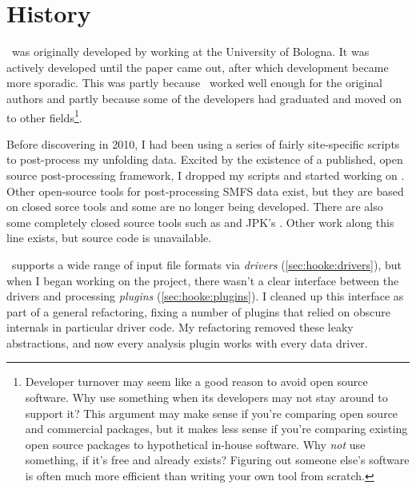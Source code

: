 \section{History}
\label{sec:hooke:history}

\Hooke\ was originally developed by \citet{sandal09} working at the
University of Bologna.  It was actively developed until the paper came
out, after which development became more sporadic.  This was partly
because \Hooke\ worked well enough for the original authors and partly
because some of the developers had graduated and moved on to other
fields\footnote{
  Developer turnover may seem like a good reason to avoid open source
  software.  Why use something when its developers may not stay around
  to support it?  This argument may make sense if you're comparing
  open source and commercial packages, but it makes less sense if
  you're comparing existing open source packages to hypothetical
  in-house software.  Why \emph{not} use something, if it's free and
  already exists?  Figuring out someone else's software is often much
  more efficient than writing your own tool from
  scratch\footnotemark{}.
}.

Before discovering \Hooke in 2010, I had been using a series of fairly
site-specific scripts to post-process my unfolding data.  Excited by
the existence of a published, open source post-processing framework, I
dropped my scripts and started working on \Hooke.  Other open-source
tools for post-processing SMFS data exist, but they are based on
closed sorce tools\citep{kuhn05,aioanei11} and some are no longer
being developed\citep{kuhn05}.  There are also some completely closed
source tools such as \citep{carl08} and JPK's
\citep{struckmeier08}.  Other work along this
line exists, but source code is unavailable\citep{andreopoulos11}.

\Hooke\ supports a wide range of input file formats via \emph{drivers}
(\cref{sec:hooke:drivers}), but when I began working on the project,
there wasn't a clear interface between the drivers and processing
\emph{plugins} (\cref{sec:hooke:plugins}).  I cleaned up this
interface as part of a general refactoring, fixing a number of plugins
that relied on obscure internals in particular driver code.  My
refactoring removed these leaky abstractions, and now every analysis
plugin works with every data driver.

